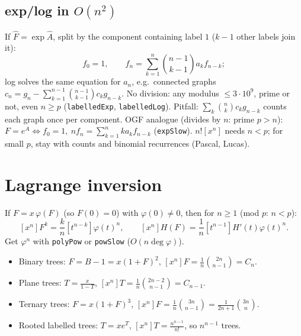 	\subsection{exp/log in $O(n^2)$}
	If $\hat F=\exp\hat A$, split by the component containing label $1$ ($k-1$ other labels join it):
	\[f_0=1,\qquad f_n=\sum_{k=1}^n\binom{n-1}{k-1}a_kf_{n-k};\]
	log solves the same equation for $a_n$, e.g.\ connected graphs $c_n=g_n-\sum_{k=1}^{n-1}\binom{n-1}{k-1}c_kg_{n-k}$. No division: any modulus $\le3\cdot10^9$, prime or not, even $n\ge p$ (\texttt{labelledExp}, \texttt{labelledLog}). Pitfall: $\sum_k\binom nkc_kg_{n-k}$ counts each graph once per component.
	OGF analogue (divides by $n$: prime $p>n$): $F=e^A\iff f_0=1,\ nf_n=\sum_{k=1}^nka_kf_{n-k}$ (\texttt{expSlow}).
	$n![x^n]$ needs $n<p$; for small $p$, stay with counts and binomial recurrences (Pascal, Lucas).

\section{Lagrange inversion}
	If $F=x\,\varphi(F)$ (so $F(0)=0$) with $\varphi(0)\ne0$, then for $n\ge1$ (mod $p$: $n<p$):
	\[[x^n]F^k=\frac kn[t^{n-k}]\varphi(t)^n,\qquad[x^n]H(F)=\frac1n[t^{n-1}]H'(t)\varphi(t)^n.\]
	Get $\varphi^n$ with \texttt{polyPow} or \texttt{powSlow} ($O(n\deg\varphi)$).
	\begin{itemize}[nosep,leftmargin=*]
	\item Binary trees: $F=B-1=x(1+F)^2$, $[x^n]F=\frac1n\binom{2n}{n-1}=C_n$.
	\item Plane trees: $T=\frac{x}{1-T}$, $[x^n]T=\frac1n\binom{2n-2}{n-1}=C_{n-1}$.
	\item Ternary trees: $F=x(1+F)^3$, $[x^n]F=\frac1n\binom{3n}{n-1}=\frac{1}{2n+1}\binom{3n}n$.
	\item Rooted labelled trees: $T=xe^T$, $[x^n]T=\frac{n^{n-1}}{n!}$, so $n^{n-1}$ trees.
	\end{itemize}

